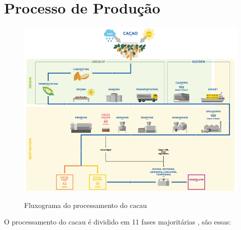 \documentclass[
	12pt,				%
	openright,			%
	oneside,			%
	a4paper,			%
	english,			%
	french,				%
	spanish,			%
	brazil				%
	]{abntex2}
\begin{document}
\newpage
\chapter{Processo de Produção}


\begin{figure}[H]
\begin{center}
\caption{Fluxograma do processamento do cacau}
\includegraphics[scale=0.59]{../../Pictures/cacaoprocess.png} 
\label{fig1}
\end{center}
\end{figure}

O processamento do cacau é dividido em 11 fases majoritárias \cite{3}, são essas:
\end{document}
